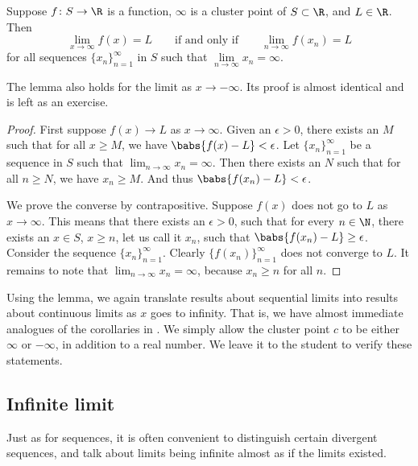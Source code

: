 \begin{lemma} \label{seqflimitinf:lemma}
Suppose $f \colon S \to \R$ is a function, $\infty$ is a cluster
point of $S \subset \R$, and $L \in \R$.  Then
\begin{equation*}
\lim_{x\to\infty} f(x) = L
\qquad \text{if and only if} \qquad
\lim_{n\to\infty} f(x_n) = L
\end{equation*}
for all sequences $\{ x_n \}_{n=1}^\infty$ in $S$ such that $\lim\limits_{n\to\infty} x_n = \infty$.
\end{lemma}

The lemma also holds for the limit as $x \to -\infty$.
Its proof is almost identical and
is left as an exercise.

\begin{proof}
First suppose $f(x) \to L$ as $x \to \infty$.
Given an $\epsilon > 0$, there exists an $M$ such that for all $x \geq M$,
we have $\babs{f(x)-L} < \epsilon$.
Let $\{ x_n \}_{n=1}^\infty$
be a sequence in $S$ such that $\lim_{n\to\infty} x_n = \infty$.  Then there exists an
$N$ such that for all $n \geq N$, we have $x_n \geq M$.  And thus
$\babs{f(x_n)-L} < \epsilon$.

We prove the converse by contrapositive.  Suppose $f(x)$ does
not go to $L$ as $x \to \infty$.
This means that there exists an $\epsilon > 0$,
such that for every $n \in \N$, there exists an $x \in S$, $x \geq n$, let
us call it $x_n$, such that $\babs{f(x_n)-L} \geq \epsilon$.
Consider the sequence $\{ x_n \}_{n=1}^\infty$.  Clearly 
$\bigl\{ f(x_n) \bigr\}_{n=1}^\infty$ does not converge to $L$.  It remains to note
that $\lim_{n\to\infty} x_n = \infty$, because $x_n \geq n$ for all $n$.
\end{proof}

Using the lemma, we again translate results about sequential
limits into results about continuous limits as $x$ goes to infinity.  That
is, we have almost immediate analogues of the corollaries
in .  We simply allow 
the cluster point $c$ to be either $\infty$ or $-\infty$, in addition
to a real number.  We leave it to
the student to verify these statements.

\subsection{Infinite limit}

Just as for sequences, it is often convenient to distinguish certain
divergent sequences, and talk about limits being infinite
almost as if the limits existed.

